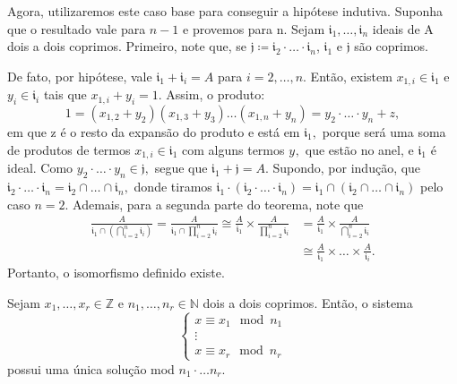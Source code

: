 \documentclass[AlgebraII/algebraII_notes.tex]{subfiles}
\begin{document}
\begin{proof*}
	Agora, utilizaremos este caso base para conseguir a hipótese indutiva. Suponha que o resultado vale para \(n-1\) e provemos para n.
	Sejam \(\mathfrak{i}_{1}, \dotsc, \mathfrak{i}_{n}\) ideais de A dois a dois coprimos. Primeiro, note que,
	se \(\mathfrak{j}\coloneqq \mathfrak{i}_{2}\cdot \dotsc \cdot \mathfrak{i}_{n}\), \(\mathfrak{i}_{1}\) e \(\mathfrak{j}\) são coprimos.

	De fato, por hipótese, vale \(\mathfrak{i}_{1}+\mathfrak{i}_{i} = A\) para \(i=2, \dotsc, n.\) Então, existem
	\(x_{1, i}\in \mathfrak{i}_{1}\) e \(y_{i}\in \mathfrak{i}_{i}\) tais que \(x_{1, i}+y_{i} = 1.\) Assim, o produto:
	\[
		1 = (x_{1, 2} + y_{2})(x_{1, 3}+y_{3})\dotsc(x_{1, n}+y_{n}) = y_{2}\cdot \dotsc \cdot y_{n}+z,
	\]
	em que z é o resto da expansão do produto e está em \(\mathfrak{i}_{1},\) porque será uma soma de produtos de termos \(x_{1, i}\in \mathfrak{i}_{1}\) com alguns
	termos \(y_{},\) que estão no anel, e \(\mathfrak{i}_{1}\) é ideal. Como \(y_{2}\cdot \dotsc \cdot y_{n}\in \mathfrak{j},\) segue que  \(\mathfrak{i}_{1} + \mathfrak{j} = A.\)
	Supondo, por indução, que \(\mathfrak{i}_{2}\cdot \dotsc \cdot \mathfrak{i}_{n} = \mathfrak{i}_{2}\cap \dotsc \cap \mathfrak{i}_{n},\) donde tiramos
	\(\mathfrak{i}_{1}\cdot (\mathfrak{i}_{2}\cdot \dotsc \cdot \mathfrak{i}_{n}) = \mathfrak{i}_{1}\cap (\mathfrak{i}_{2}\cap \dotsc\cap \mathfrak{i}_{n})\) pelo caso \(n=2\).
	Ademais, para a segunda parte do teorema, note que
	\begin{align*}
		\frac{A}{\mathfrak{i}_{1}\cap(\bigcap_{i=2}^{n}\mathfrak{i}_{i})} = \frac{A}{\mathfrak{i}_{1}\cap \prod\limits_{i=2}^{n}\mathfrak{i}_{i}}\cong \frac{A}{\mathfrak{i}_{1}}\times \frac{A}{\prod\limits_{i=2}^{n}\mathfrak{i}_{i}} & =\frac{A}{\mathfrak{i}_{1}}\times \frac{A}{\bigcap_{i=2}^{n}\mathfrak{i}_{i}}   \\
		                                                                                                                                                                                                                                 & \cong \frac{A}{\mathfrak{i}_{1}}\times \dotsc\times \frac{A}{\mathfrak{i}_{i}}.
	\end{align*}
	Portanto, o isomorfismo definido existe. \qedsymbol
\end{proof*}
\begin{crl*}
	Sejam \(x_{1}, \dotsc, x_{r}\in \mathbb{Z}\) e \(n_{1}, \dotsc, n_{r}\in \mathbb{N}\) dois a dois coprimos. Então,
	o sistema
	\begin{equation*}
		\left\{\begin{array}{ll}
			x\equiv x_{1}\mod n_{1} \\
			\vdots                  \\
			x\equiv x_{r}\mod n_{r}
		\end{array}\right.
	\end{equation*}
	possui uma única solução mod \(n_{1}\cdot \dotsc n_{r}.\)
\end{crl*}
\end{document}
